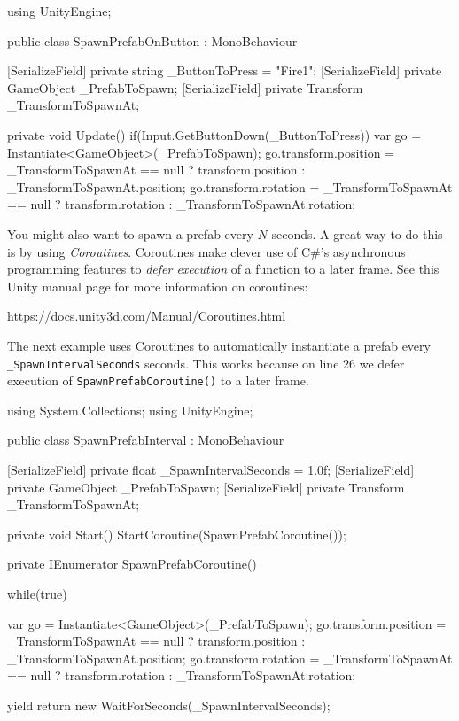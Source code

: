 \documentclass[11pt]{article}
\def\StartLineAt#1{\lstset{firstnumber=#1}}
\begin{document}
\StartLineAt{1}
\begin{csharp}
using UnityEngine;

public class SpawnPrefabOnButton : MonoBehaviour
{
    [SerializeField]
    private string _ButtonToPress = "Fire1";
    [SerializeField]
    private GameObject _PrefabToSpawn;
    [SerializeField]
    private Transform _TransformToSpawnAt;

    private void Update()
    {
        if(Input.GetButtonDown(_ButtonToPress))
        {
            var go = Instantiate<GameObject>(_PrefabToSpawn);
            go.transform.position = _TransformToSpawnAt == null ? transform.position : _TransformToSpawnAt.position;
            go.transform.rotation = _TransformToSpawnAt == null ? transform.rotation : _TransformToSpawnAt.rotation;
        }
    }
}
\end{csharp}

You might also want to spawn a prefab every $N$ seconds.  A great way to do this is by using
\textit{Coroutines}.  Coroutines make clever use of C\#'s asynchronous programming features to
\textit{defer execution} of a function to a later frame.  See this Unity manual page for more
information on coroutines:

\begin{center}
\href{https://docs.unity3d.com/Manual/Coroutines.html}{https://docs.unity3d.com/Manual/Coroutines.html}
\end{center}

The next example uses Coroutines to automatically instantiate a prefab every 
\lstinline|_SpawnIntervalSeconds| seconds.  This works because on line 26 we defer execution of
\lstinline|SpawnPrefabCoroutine()| to a later frame.

\StartLineAt{1}
\begin{csharp}
using System.Collections;
using UnityEngine;

public class SpawnPrefabInterval : MonoBehaviour
{
    [SerializeField]
    private float _SpawnIntervalSeconds = 1.0f;
    [SerializeField]
    private GameObject _PrefabToSpawn;
    [SerializeField]
    private Transform _TransformToSpawnAt;

    private void Start()
    {
        StartCoroutine(SpawnPrefabCoroutine());
    }

    private IEnumerator SpawnPrefabCoroutine()
    {
        while(true)
        {
            var go = Instantiate<GameObject>(_PrefabToSpawn);
            go.transform.position = _TransformToSpawnAt == null ? transform.position : _TransformToSpawnAt.position;
            go.transform.rotation = _TransformToSpawnAt == null ? transform.rotation : _TransformToSpawnAt.rotation;

            yield return new WaitForSeconds(_SpawnIntervalSeconds);
        }
    }
}
\end{csharp}
\pagebreak
\end{document}

